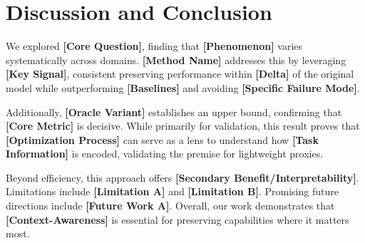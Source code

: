 \section{Discussion and Conclusion}
\label{sec:discussion}

We explored \textbf{[Core Question]}, finding that \textbf{[Phenomenon]} varies systematically across domains. \textbf{[Method Name]} addresses this by leveraging \textbf{[Key Signal]}, consistent preserving performance within \textbf{[Delta]} of the original model while outperforming \textbf{[Baselines]} and avoiding \textbf{[Specific Failure Mode]}.

Additionally, \textbf{[Oracle Variant]} establishes an upper bound, confirming that \textbf{[Core Metric]} is decisive. While primarily for validation, this result proves that \textbf{[Optimization Process]} can serve as a lens to understand how \textbf{[Task Information]} is encoded, validating the premise for lightweight proxies.

Beyond efficiency, this approach offers \textbf{[Secondary Benefit/Interpretability]}. Limitations include \textbf{[Limitation A]} and \textbf{[Limitation B]}. Promising future directions include \textbf{[Future Work A]}. Overall, our work demonstrates that \textbf{[Context-Awareness]} is essential for preserving capabilities where it matters most.